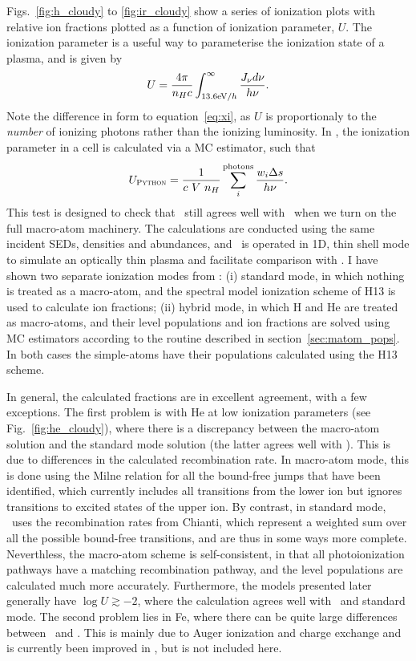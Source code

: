 Figs.~\ref{fig:h_cloudy} to \ref{fig:ir_cloudy} show a series of 
ionization plots with relative ion fractions plotted as a function of
ionization parameter, $U$. The ionization parameter is a useful
way to parameterise the ionization state of a plasma, and is given by
\begin{equation}
U = \frac{4\pi}{n_H c}\int_{13.6{\rm{eV}} / h}^{\infty}\frac{{J_{\nu}d\nu}}{h\nu}.
\label{eq:ip}
\end{equation}
Note the difference in form to equation~\ref{eq:xi}, as $U$ is proportionaly to
the {\em number} of ionizing photons rather than the ionizing luminosity.
In \py, the ionization parameter in a cell 
is calculated via a MC estimator, such that
\begin{equation}
U_{\textsc{Python}} = \frac{1}{c~V~n_H} \sum_i^{\mathrm{photons}} \frac{w_i \Delta s}{h \nu}.
\end{equation}
This test is designed to check that \py\ still agrees
well with \cld\ when we turn on the full macro-atom machinery.
The calculations are conducted using the same 
incident SEDs, densities and abundances, and \py\ is operated in
1D, thin shell mode to simulate an optically thin plasma and facilitate
comparison with \cld. I have shown two separate ionization modes
from \py: (i) standard mode, in which nothing is treated as a macro-atom,
and the spectral model ionization scheme of H13 is used to calculate
ion fractions; (ii) hybrid mode, in which H and He are treated as 
macro-atoms, and their level populations and ion fractions are solved
using MC estimators according to the routine
described in section~\ref{sec:matom_pops}. In both 
cases the simple-atoms have their populations calculated using the H13 scheme.

In general, the calculated fractions are in excellent agreement, with a few 
exceptions. The first problem is with He at low ionization parameters 
(see Fig.~\ref{fig:he_cloudy}), where there is a discrepancy between 
the macro-atom solution and the standard mode solution 
(the latter agrees well with \cld). This is due to 
differences in the calculated recombination rate. In macro-atom mode, 
this is done using the Milne relation for all the bound-free jumps that 
have been identified, which currently includes all transitions from the lower ion but
ignores transitions to excited states of the upper ion. By contrast, 
in standard mode, \py\ uses the recombination rates from Chianti,
which represent a weighted sum over all the possible bound-free transitions,
and are thus in some ways more complete. Neverthless, the macro-atom
scheme is self-consistent, in that all photoionization pathways have a matching 
recombination pathway, and the level populations are calculated much more
accurately. Furthermore, the models presented later generally have 
$\log U \gtrsim -2$, where the calculation
agrees well with \cld\ and standard mode.
The second problem lies in Fe, where there can be quite large differences
between \py\ and \cld. This is mainly due to Auger ionization and charge 
exchange and is currently been improved in \py, but is not included here.  

